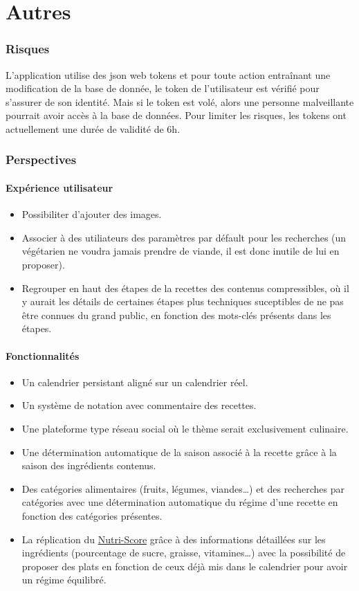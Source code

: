 \part{Autres}
\section{Risques}
L'application utilise des json web tokens et pour toute action entraînant une modification de la base de donnée, le token de l'utilisateur est vérifié pour s'assurer de son identité. Mais si le token est volé, alors une personne malveillante pourrait avoir accès à la base de données. Pour limiter les risques, les tokens ont actuellement une durée de validité de 6h.
\section{Perspectives}
\subsection{Expérience utilisateur}
\begin{itemize}
	\item Possibiliter d'ajouter des images.
	\item Associer à des utiliateurs des paramètres par défault pour les recherches (un végétarien ne voudra jamais prendre de viande, il est donc inutile de lui en proposer).
	\item Regrouper en haut des étapes de la recettes des contenus compressibles, où il y aurait les détails de certaines étapes plus techniques suceptibles de ne pas être connues du grand public, en fonction des mots-clés présents dans les étapes.
\end{itemize}

\subsection{Fonctionnalités}
\begin{itemize}
	\item Un calendrier persistant aligné sur un calendrier réel.
	\item Un système de notation avec commentaire des recettes.
	\item Une plateforme type réseau social où le thème serait exclusivement culinaire.
	\item Une détermination automatique de la saison associé à la recette grâce à la saison des ingrédients contenus.
	\item Des catégories alimentaires (fruits, légumes, viandes\dots) et des recherches par catégories avec une détermination automatique du régime d'une recette en fonction des catégories présentes.
	\item La réplication du \href{https://www.santepubliquefrance.fr/determinants-de-sante/nutrition-et-activite-physique/articles/nutri-score}{Nutri-Score} grâce à des informations détaillées sur les ingrédients (pourcentage de sucre, graisse, vitamines\dots) avec la possibilité de proposer des plats en fonction de ceux déjà mis dans le calendrier pour avoir un régime équilibré.
\end{itemize}
\label{page:lastpage}

